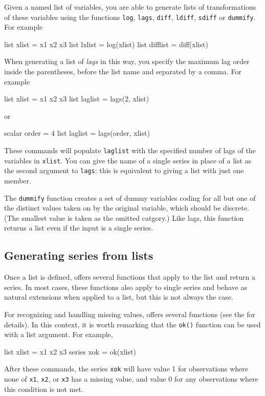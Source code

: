 Given a named list of variables, you are able to generate lists of
transformations of these variables using the functions \texttt{log},
\texttt{lags}, \texttt{diff}, \texttt{ldiff}, \texttt{sdiff} or
\texttt{dummify}.  For example
%
\begin{code}
list xlist = x1 x2 x3
list lxlist = log(xlist)
list difflist = diff(xlist)
\end{code}

When generating a list of \textit{lags} in this way, you specify the
maximum lag order inside the parentheses, before the list name and
separated by a comma.  For example
%
\begin{code}
list xlist = x1 x2 x3
list laglist = lags(2, xlist)
\end{code}
%
or
%
\begin{code}
scalar order = 4
list laglist = lags(order, xlist)
\end{code}

These commands will populate \texttt{laglist} with the specified
number of lags of the variables in \texttt{xlist}.  You can give the
name of a single series in place of a list as the second argument to
\texttt{lags}: this is equivalent to giving a list with just one
member.

The \texttt{dummify} function creates a set of dummy variables coding
for all but one of the distinct values taken on by the original
variable, which should be discrete.  (The smallest value is taken as
the omitted catgory.)  Like lags, this function returns a list even if
the input is a single series.


\subsection{Generating series from lists}

Once a list is defined,  offers several functions that
apply to the list and return a series. In most cases, these functions
also apply to single series and behave as natural extensions when
applied to a list, but this is not always the case.

For recognizing and handling missing values,  offers
several functions (see the \GCR{} for details). In this context, it is
worth remarking that the \texttt{ok()} function can be used with a
list argument.  For example,
%
\begin{code}
list xlist = x1 x2 x3
series xok = ok(xlist)
\end{code}
%
After these commands, the series \texttt{xok} will have value 1 for
observations where none of \texttt{x1}, \texttt{x2}, or
\texttt{x3} has a missing value, and value 0 for any observations
where this condition is not met.

